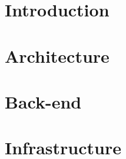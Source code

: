 \documentclass[10pt]{report}
\begin{document}

\restoregeometry

\setcounter{tocdepth}{5}
\tableofcontents
\listoffigures
\listoftables

\justify

\chapter{Introduction}

\pagebreak

\chapter{Architecture}

\pagebreak

\chapter{Back-end}

\pagebreak

\chapter{Infrastructure}

\pagebreak

\printbibliography
\end{document}
